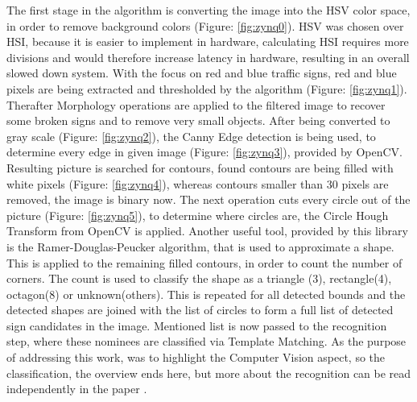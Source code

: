 The first stage in the algorithm is
converting the image into the HSV color space, in order to remove background colors (Figure: \ref{fig:zynq0}). HSV was chosen over HSI, because it is easier to implement in hardware, calculating  HSI requires more divisions and would therefore increase latency in hardware, resulting in an overall slowed down system. With the focus on red and blue traffic signs, red and blue pixels are being extracted and thresholded by the algorithm (Figure: \ref{fig:zynq1}). Therafter Morphology  operations  are  applied  to  the  filtered image to recover some broken signs and to remove very small objects. After being converted to gray scale (Figure: \ref{fig:zynq2}), the Canny Edge detection is being used, to determine every edge in given image (Figure: \ref{fig:zynq3}), provided by OpenCV. Resulting picture is searched for contours, found contours are being filled with white pixels (Figure: \ref{fig:zynq4}), whereas contours smaller than 30 pixels are removed, the image is binary now. The next operation cuts every circle out of the picture (Figure: \ref{fig:zynq5}), to determine where circles are, the Circle Hough Transform from OpenCV is applied.
Another useful tool, provided by this library is the  Ramer-Douglas-Peucker 
algorithm, that is used to approximate a shape.
This is applied to the remaining filled contours, in order to count the number of corners. The count is used
to classify the shape as a triangle (3), rectangle(4), octagon(8) or unknown(others). This is repeated for all detected bounds and the detected shapes are joined with the list of circles to form a full list of detected sign candidates in the image. Mentioned list is now passed to the recognition step, where these nominees are classified via Template Matching. \newline
As the purpose of addressing this work, was to highlight the Computer Vision aspect, so the classification, the overview ends here, but more about the recognition can be read independently in the paper \cite{zynq}. 

